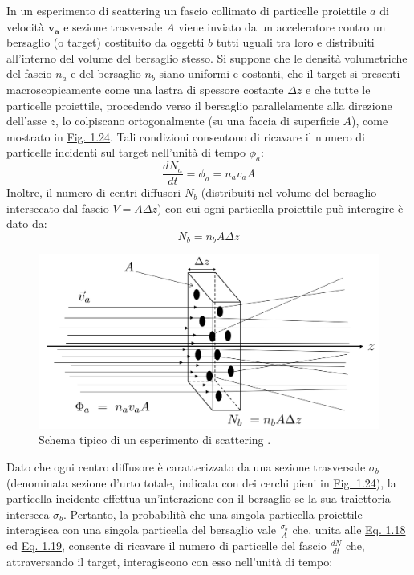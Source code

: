 \documentclass[12pt,a4paper,twoside]{report}
\newcommand{\vect}[1]{\boldsymbol{#1}}
\begin{document}
	In un esperimento di scattering un fascio collimato di particelle proiettile $a$ di velocità $\vect{v_a}$ e sezione trasversale $A$ viene inviato da un acceleratore contro un bersaglio (o target) costituito da oggetti $b$ tutti uguali tra loro e distribuiti all'interno del volume del bersaglio stesso. Si suppone che le densità volumetriche del fascio $n_a$ e del bersaglio $n_b$ siano uniformi e costanti, che il target si presenti macroscopicamente come una lastra di spessore costante $\Delta z$ e che tutte le particelle proiettile, procedendo verso il bersaglio parallelamente alla direzione dell'asse $z$, lo colpiscano ortogonalmente (su una faccia di superficie $A$), come mostrato in \hyperref[fig:scattering]{Fig. 1.24}. Tali condizioni consentono di ricavare il numero di particelle incidenti sul target nell'unità di tempo $\phi_a$:
	\begin{equation}
		\frac{dN_a}{dt}=\phi_a=n_av_aA
		\label{eq:scattering1}
	\end{equation}
	Inoltre, il numero di centri diffusori $N_b$ (distribuiti nel volume del bersaglio intersecato dal fascio $V=A\Delta z$) con cui ogni particella proiettile può interagire è dato da:
	\begin{equation}
		N_b=n_bA\Delta z
		\label{eq:scattering2}
	\end{equation}
	\begin{figure}[H]
		\centering
		\includegraphics[width=0.9\linewidth]{scattering.jpg}
		\caption{Schema tipico di un esperimento di scattering \cite{units_sezUrto}.}
		\label{fig:scattering}
	\end{figure}
	Dato che ogni centro diffusore è caratterizzato da una sezione trasversale $\sigma_b$ (denominata sezione d'urto totale, indicata con dei cerchi pieni in \hyperref[fig:scattering]{Fig. 1.24}), la particella incidente effettua un'interazione con il bersaglio se la sua traiettoria interseca $\sigma_b$. Pertanto, la probabilità che una singola particella proiettile interagisca con una singola particella del bersaglio vale $\frac{\sigma_b}{A}$ che, unita alle \hyperref[eq:scattering1]{Eq. 1.18} ed \hyperref[eq:scattering2]{Eq. 1.19}, consente di ricavare il numero di particelle del fascio $\frac{dN}{dt}$ che, attraversando il target, interagiscono con esso nell'unità di tempo:
\end{document}
